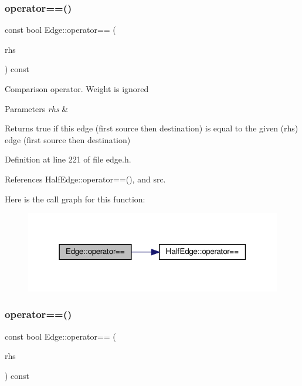 \subsubsection{\texorpdfstring{operator==()}{operator==()}\hspace{0.1cm}{\footnotesize\ttfamily [1/2]}}
{\footnotesize\ttfamily const bool Edge\+::operator== (\begin{DoxyParamCaption}\item[{const \hyperlink{classEdge}{Edge} \&}]{rhs }\end{DoxyParamCaption}) const\hspace{0.3cm}{\ttfamily [inline]}}

Comparison operator. Weight is ignored 
\begin{DoxyParams}{Parameters}
{\em rhs} & \\
\hline
\end{DoxyParams}
\begin{DoxyReturn}{Returns}
true if this edge (first source then destination) is equal to the given (rhs) edge (first source then destination) 
\end{DoxyReturn}


Definition at line 221 of file edge.\+h.



References Half\+Edge\+::operator==(), and src.

Here is the call graph for this function\+:\nopagebreak
\begin{figure}[H]
\begin{center}
\leavevmode
\includegraphics[width=318pt]{classEdge_abe84b58ced477ebeef5078e4cb48b49f_cgraph}
\end{center}
\end{figure}
\mbox{\label{classEdge_aa05a0ee020bc6c31ed604c2d4bed8319}} 
\subsubsection{\texorpdfstring{operator==()}{operator==()}\hspace{0.1cm}{\footnotesize\ttfamily [2/2]}}
{\footnotesize\ttfamily const bool Edge\+::operator== (\begin{DoxyParamCaption}\item[{const \hyperlink{edge_8h_a5fbd20c46956d479cb10afc9855223f6}{type\+Vertex} \&}]{rhs }\end{DoxyParamCaption}) const\hspace{0.3cm}{\ttfamily [inline]}}

